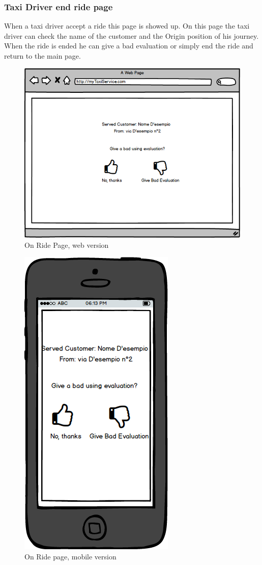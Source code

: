 \documentclass{report}
\begin{document}
			
			
			\subsubsection{Taxi Driver end ride page}
			When a taxi driver accept a ride this page is showed up. On this page the taxi driver can check the name of the customer and the Origin position of his journey. When the ride is ended 				he can give a bad evaluation or simply end the ride and return to the main page.
			\begin{figure}[H]
			\centering
			\includegraphics[scale=0.5]{IMG/UserInterfaces/onRidePage.png}
			\caption{On Ride Page, web version}\label{visina8}
			\end{figure}
			\begin{figure}[H]
			\centering
			\includegraphics[scale=0.4]{IMG/UserInterfaces/onRidePage_m.png}
			\caption{On Ride page, mobile version}\label{visina8}
			\end{figure}
			
\end{document}

